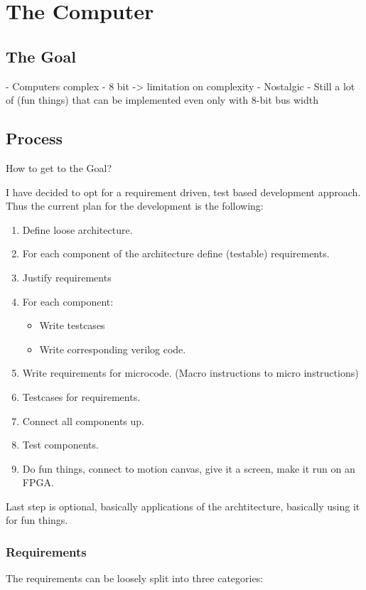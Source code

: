 \chapter{The Computer} %
\label{chap:The Computer}

\section{The Goal}

- Computers complex
- 8 bit -> limitation on complexity
- Nostalgic
- Still a lot of (fun things) that can be implemented even only with 8-bit bus width

\section{Process}
How to get to the Goal?

I have decided to opt for a requirement driven, test based development approach. Thus the current plan for the development is the following:
\begin{enumerate}
  \item Define loose architecture. 
  \item For each component of the architecture define (testable) requirements. 
  \item Justify requirements
  \item For each component:
  \begin{itemize}
    \item Write testcases
    \item Write corresponding verilog code.
  \end{itemize}
  \item Write requirements for microcode. (Macro instructions to micro instructions) 
  \item Testcases for requirements. 
  \item Connect all components up.
  \item Test components.
  \item Do fun things, connect to motion canvas, give it a screen, make it run on an FPGA.
\end{enumerate}

Last step is optional, basically applications of the archtitecture, basically using it for fun things. 


\subsection{Requirements}
The requirements can be loosely split into three categories:

